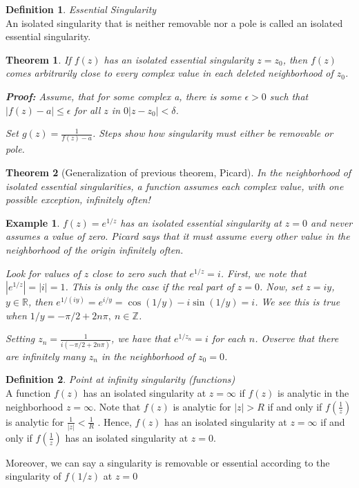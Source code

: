 \documentclass{article}
\newtheorem{theorem}{Theorem}[section]
\newtheorem{ex}{Example}
\theoremstyle{definition}
\newtheorem{definition}{Definition}[section]
\newcommand{\Def}[2]{
\begin{shaded*}
\begin{definition}{\textit{#1}}\\#2\end{definition}
\end{shaded*}
}
\def\R{\mathbb{R}}
\begin{document}
\Def{Essential Singularity}{An isolated singularity that is neither removable nor a pole is called an isolated essential singularity.}

\begin{theorem}
If $f(z)$ has an isolated essential singularity $z=z_0$, then $f(z)$ comes arbitrarily close to every complex value in each deleted neighborhood of $z_0$. 

\textbf{Proof:} Assume, that for some complex a, there is some $\epsilon>0$ such that $|f(z)-a|\leq \epsilon$ for all $z$ in $0 |z-z_0|<\delta$. 

Set $g(z) = \frac{1}{f(z)-a}$. Steps show how singularity must either be removable or pole. 

\end{theorem}
\begin{theorem}[Generalization of previous theorem, Picard]
In the neighborhood of isolated essential singularities, a function assumes each complex value, with one possible exception, infinitely often!
\end{theorem}

\begin{ex}
$f(z) = e^{1/z}$ has an isolated essential singularity at $z=0$ and never assumes a value of zero. Picard says that it must assume every other value in the neighborhood of the origin infinitely often.

Look for values of $z$ close to zero such that $e^{1/z}=i$. First, we note that $|e^{1/z}|=|i|=1$. This is only the case if the real part of $z= 0$. Now, set $z=iy$, $y\in\R$, then $e^{1/(iy)} = e^{i/y} = \cos(1/y) - i \sin (1/y) = i$. We see this is true when $1/y = -\pi/2 + 2 n \pi,\ n \in \mathbb{Z}$. 

Setting $z_n = \frac{1}{i(-\pi/2+2n\pi)}$, we have that $e^{1/z_n} = i$ for each $n$. Ovserve that there are infinitely many $z_n$ in the neighborhood of $z_0=0$. 
\end{ex}

\Def{Point at infinity singularity (functions)}{A function $f(z)$ has an isolated singularity at $z=\infty$ if $f(z)$ is analytic in the neighborhood $z=\infty$. Note that $f(z)$ is analytic for $|z|>R$ if and only if $f(\frac{1}{z})$is analytic for $\frac{1}{|z|}< \frac{1}{R}$ . Hence, $f(z)$ has an isolated singularity at $z=\infty$ if and only if $f(\frac{1}{z})$ has an isolated singularity at $z=0$. 

Moreover, we can say a singularity is removable or essential according to the singularity of $f(1/z)$ at $z=0$} 
\end{document}
